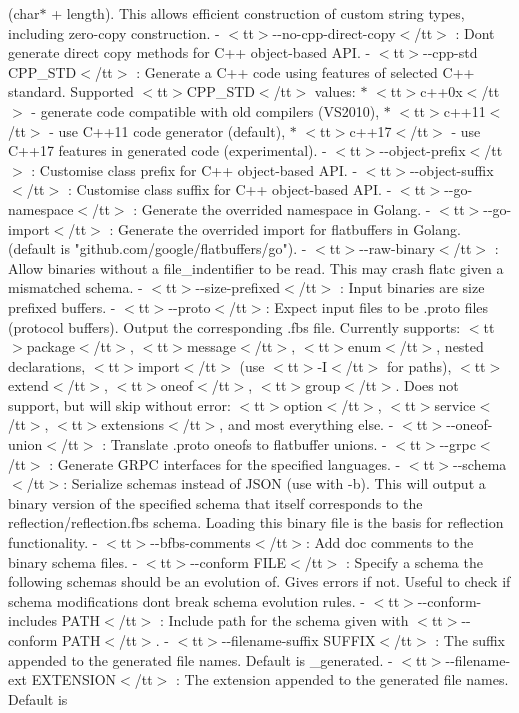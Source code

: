 \begin{DoxyItemize}
(char\texorpdfstring{$\ast$}{*} + length). This allows efficient     construction of custom string types, including zero-\/copy construction.  -\/   $<$tt$>$-\/-\/no-\/cpp-\/direct-\/copy$<$/tt$>$ \+: Don\textquotesingle{}t generate direct copy methods for C++     object-\/based API.  -\/   $<$tt$>$-\/-\/cpp-\/std CPP\+\_\+\+STD$<$/tt$>$ \+: Generate a C++ code using features of selected C++ standard.      Supported $<$tt$>$\+CPP\+\_\+\+STD$<$/tt$>$ values\+:     \texorpdfstring{$\ast$}{*} $<$tt$>$c++0x$<$/tt$>$ -\/ generate code compatible with old compilers (\+VS2010),     \texorpdfstring{$\ast$}{*} $<$tt$>$c++11$<$/tt$>$ -\/ use C++11 code generator (default),     \texorpdfstring{$\ast$}{*} $<$tt$>$c++17$<$/tt$>$ -\/ use C++17 features in generated code (experimental).  -\/   $<$tt$>$-\/-\/object-\/prefix$<$/tt$>$ \+: Customise class prefix for C++ object-\/based API.  -\/   $<$tt$>$-\/-\/object-\/suffix$<$/tt$>$ \+: Customise class suffix for C++ object-\/based API.  -\/   $<$tt$>$-\/-\/go-\/namespace$<$/tt$>$ \+: Generate the overrided namespace in Golang.  -\/   $<$tt$>$-\/-\/go-\/import$<$/tt$>$ \+: Generate the overrided import for flatbuffers in Golang.      (default is "{}github.\+com/google/flatbuffers/go"{}).  -\/   $<$tt$>$-\/-\/raw-\/binary$<$/tt$>$ \+: Allow binaries without a file\+\_\+indentifier to be read.     This may crash flatc given a mismatched schema.  -\/   $<$tt$>$-\/-\/size-\/prefixed$<$/tt$>$ \+: Input binaries are size prefixed buffers.  -\/   $<$tt$>$-\/-\/proto$<$/tt$>$\+: Expect input files to be .\+proto files (protocol buffers).     Output the corresponding .\+fbs file.     Currently supports\+: $<$tt$>$package$<$/tt$>$, $<$tt$>$message$<$/tt$>$, $<$tt$>$enum$<$/tt$>$, nested declarations,     $<$tt$>$import$<$/tt$>$ (use $<$tt$>$-\/\+I$<$/tt$>$ for paths), $<$tt$>$extend$<$/tt$>$, $<$tt$>$oneof$<$/tt$>$, $<$tt$>$group$<$/tt$>$.     Does not support, but will skip without error\+: $<$tt$>$option$<$/tt$>$, $<$tt$>$service$<$/tt$>$,     $<$tt$>$extensions$<$/tt$>$, and most everything else.  -\/   $<$tt$>$-\/-\/oneof-\/union$<$/tt$>$ \+: Translate .\+proto oneofs to flatbuffer unions.  -\/   $<$tt$>$-\/-\/grpc$<$/tt$>$ \+: Generate GRPC interfaces for the specified languages.  -\/   $<$tt$>$-\/-\/schema$<$/tt$>$\+: Serialize schemas instead of JSON (use with -\/b). This will     output a binary version of the specified schema that itself corresponds     to the reflection/reflection.\+fbs schema. Loading this binary file is the     basis for reflection functionality.  -\/   $<$tt$>$-\/-\/bfbs-\/comments$<$/tt$>$\+: Add doc comments to the binary schema files.  -\/   $<$tt$>$-\/-\/conform FILE$<$/tt$>$ \+: Specify a schema the following schemas should be     an evolution of. Gives errors if not. Useful to check if schema     modifications don\textquotesingle{}t break schema evolution rules.  -\/   $<$tt$>$-\/-\/conform-\/includes PATH$<$/tt$>$ \+: Include path for the schema given with     $<$tt$>$-\/-\/conform PATH$<$/tt$>$.  -\/   $<$tt$>$-\/-\/filename-\/suffix SUFFIX$<$/tt$>$ \+: The suffix appended to the generated     file names. Default is \textquotesingle{}\+\_\+generated\textquotesingle{}.  -\/   $<$tt$>$-\/-\/filename-\/ext EXTENSION$<$/tt$>$ \+: The extension appended to the generated     file names. Default is 
\end{DoxyItemize}
